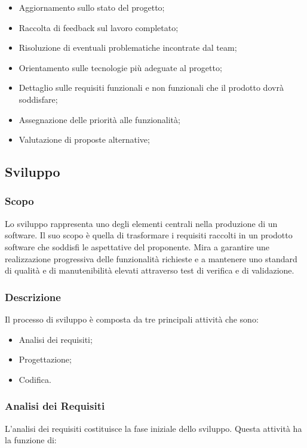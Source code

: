         \begin{itemize}
            \item Aggiornamento sullo stato del progetto;
            \item Raccolta di feedback sul lavoro completato;
            \item Risoluzione di eventuali problematiche incontrate dal team;
            \item Orientamento sulle tecnologie più adeguate al progetto;
            \item Dettaglio sulle requisiti funzionali e non funzionali che il prodotto dovrà soddisfare;
            \item Assegnazione delle priorità alle funzionalità;
            \item Valutazione di proposte alternative;
        \end{itemize}

    \subsection{Sviluppo}
        \subsubsection{Scopo}
        Lo sviluppo rappresenta uno degli elementi centrali nella produzione di un software.
        Il suo scopo è quella di trasformare i requisiti raccolti in un 
        prodotto software che soddisfi le aspettative del 
        proponente. Mira a garantire une realizzazione progressiva delle 
        funzionalità richieste e a mantenere uno standard di qualità e di
        manutenibilità elevati attraverso test di verifica e di validazione.

        \subsubsection{Descrizione}
        Il processo di sviluppo è composta da tre principali attività che sono:
        \begin{itemize}
            \item Analisi dei requisiti;
            \item Progettazione;
            \item Codifica.
        \end{itemize}


        \subsubsection{Analisi dei Requisiti}
        L'analisi dei requisiti costituisce la fase iniziale dello sviluppo.
        Questa attività ha la funzione di: 

